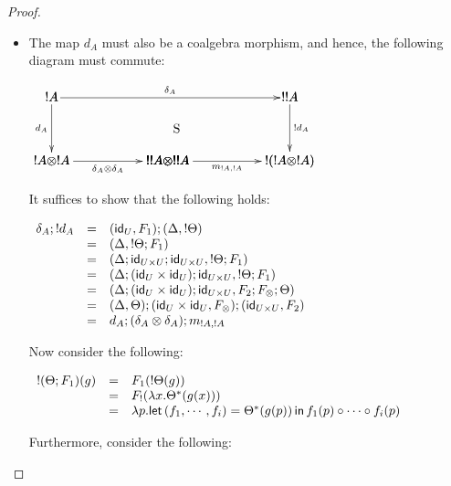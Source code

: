 \begin{proof}
\begin{report}
\begin{itemize}
  \item The map $d_A$ must also be a coalgebra morphism, and hence,
    the following diagram must commute:
    \begin{center}
      \begin{math}
        \bfig
        \morphism(40,500)<1780,0>[`;\delta_{A}]
        \hSquares/``->``->`->`->/[!A``!!A`!A \otimes !A`!!A \otimes !!A`!(!A \otimes !A);``d_A``!d_A`\delta_A \otimes \delta_A`m_{!A,!A}]
        \place(980,250)[\text{S}]        
        \efig                
      \end{math}
    \end{center}
    It suffices to show that the following holds:
    \begin{center}
      \begin{math}
        \begin{array}{lll}
          \delta_A;!d_A
          & = & (\mathsf{id}_U,F_1);(\Delta,!\Theta)\\
          & = & (\Delta,!\Theta;F_1)\\
          & = & (\Delta;\mathsf{id}_{U \times U};\mathsf{id}_{U \times U},!\Theta;F_1)\\
          & = & (\Delta;(\mathsf{id}_{U} \times \mathsf{id}_{U});\mathsf{id}_{U \times U},!\Theta;F_1)\\
          & = & (\Delta;(\mathsf{id}_{U} \times \mathsf{id}_{U});\mathsf{id}_{U \times U},F_2;F_\otimes;\Theta)\\
          & = & (\Delta,\Theta);(\mathsf{id}_{U} \times \mathsf{id}_{U},F_\otimes);(\mathsf{id}_{U \times U},F_2)\\
          & = & d_A;(\delta_A \otimes \delta_A);m_{!A,!A}\\
        \end{array}
      \end{math}
    \end{center}
    Now consider the following:
    \begin{center}
      \begin{math}
        \begin{array}{lll}
          !(\Theta;F_1)(g)
          & = & F_1(!\Theta(g))\\
          & = & F_!(\lambda x.\Theta^*(g(x)))\\
          & = & \lambda p.\mathsf{let}\, (f_1,\cdots,f_i) = \Theta^*(g(p)) \,\mathsf{in}\, f_1(p) \circ \cdots \circ f_i(p)\\          
        \end{array}
      \end{math}
    \end{center}
    Furthermore, consider the following:

\end{itemize}
\end{report}
\end{proof}

